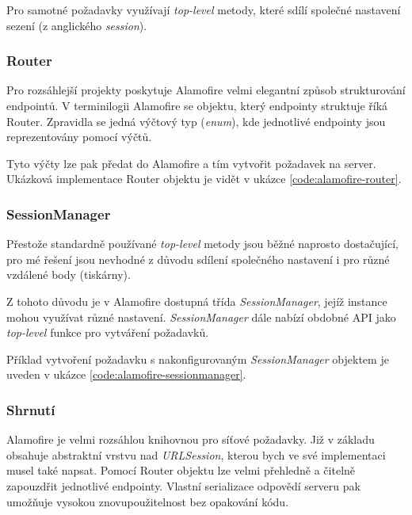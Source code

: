 Pro samotné požadavky využívají \textit{top-level} metody, které sdílí společné nastavení sezení (z anglického \textit{session}).

\subsubsection{Router}

Pro rozsáhlejší projekty poskytuje Alamofire velmi elegantní způsob strukturování endpointů.
V terminilogii Alamofire se objektu, který endpointy struktuje říká Router.
Zpravidla se jedná výčtový typ (\textit{enum}), kde jednotlivé endpointy jsou reprezentovány pomocí výčtů.

Tyto výčty lze pak předat do Alamofire a tím vytvořit požadavek na server.
Ukázková implementace Router objektu je vidět v ukázce \ref{code:alamofire-router}.


\subsubsection{SessionManager}

Přestože standardně používané \textit{top-level} metody jsou běžné naprosto dostačující, pro mé řešení jsou nevhodné z důvodu sdílení společného nastavení i pro různé vzdálené body (tiskárny).

Z tohoto důvodu je v Alamofire dostupná třída \textit{SessionManager}, jejíž instance mohou využívat různé nastavení.
\textit{SessionManager} dále nabízí obdobné API jako \textit{top-level} funkce pro vytváření požadavků.

Příklad vytvoření požadavku s nakonfigurovaným \textit{SessionManager} objektem je uveden v ukázce \ref{code:alamofire-sessionmanager}.


\subsubsection{Shrnutí}

Alamofire je velmi rozsáhlou knihovnou pro síťové požadavky.
Již v základu obsahuje abstraktní vrstvu nad \textit{URLSession}, kterou bych ve své implementaci musel také napsat.
Pomocí Router objektu lze velmi přehledně a čitelně zapouzdřit jednotlivé endpointy.
Vlastní serializace odpovědí serveru pak umožňuje vysokou znovupoužitelnost bez opakování kódu.

